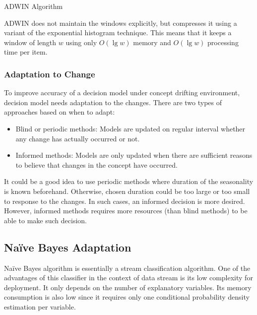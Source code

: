 \begin{algorithm}[htbp]
    \DontPrintSemicolon
\label{alg:adwin}
\caption{ADWIN Algorithm}

\end{algorithm}

ADWIN does not maintain the windows explicitly, but compresses it using a variant of the exponential histogram technique. This means that it keeps a window of length $w$ using only $O(\lg w)$ memory and $O(\lg w)$ processing time per item.

\subsubsection{Adaptation to Change}
To improve accuracy of a decision model under concept drifting environment, decision model needs adaptation to the changes. There are two types of approaches based on when to adapt: 
\begin{itemize}    
    \item Blind or periodic methods: Models are updated on regular interval whether any change has actually occurred or not. 
    \item Informed methods: Models are only updated when there are sufficient reasons to believe that changes in the concept have occurred.
\end{itemize}
It could be a good idea to use periodic methods where duration of the seasonality is known beforehand. Otherwise, chosen duration could be too large or too small to response to the changes. In such cases, an informed decision is more desired. However, informed methods requires more resources (than blind methods) to be able to make such decision.

\subsection{Na\"ive Bayes Adaptation}
Na\"ive Bayes algorithm is essentially a stream classification algorithm. One of the advantages of this classifier in the context of data stream is its low complexity for deployment. It only depends on the number of explanatory variables. Its memory consumption is also low since it requires only one conditional probability density estimation per variable.

